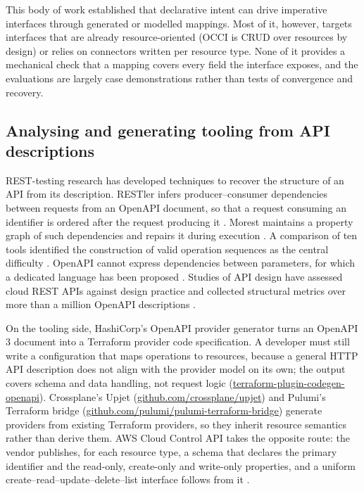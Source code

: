 This body of work established that declarative intent can drive imperative interfaces through
generated or modelled mappings. Most of it, however, targets interfaces that are already
resource-oriented (OCCI is CRUD over resources by design) or relies on connectors written per
resource type. None of it provides a mechanical check that a mapping covers every field the
interface exposes, and the evaluations are largely case demonstrations rather than tests of
convergence and recovery.

\subsection{Analysing and generating tooling from API descriptions}\label{sec:2.4}

REST-testing research has developed techniques to recover the structure of an API from its
description. RESTler infers producer--consumer dependencies between requests from an OpenAPI document,
so that a request consuming an identifier is ordered after the request producing it
\citep{atlidakis2019}. Morest maintains a property graph
of such dependencies and repairs it during execution
\citep{liu2022}. A comparison of ten tools identified
the construction of valid operation sequences as the central difficulty
\citep{kim2022}. OpenAPI cannot express dependencies
between parameters, for which a dedicated language has been proposed
\citep{martinlopez2022}. Studies of API design have
assessed cloud REST APIs against design practice
\citep{petrillo2016} and collected structural
metrics over more than a million OpenAPI descriptions
\citep{serbout2024}.

On the tooling side, HashiCorp's OpenAPI provider generator turns an OpenAPI 3 document into a
Terraform provider code specification. A developer must still write a configuration that maps
operations to resources, because a general HTTP API description does not align with the provider
model on its own; the output covers schema and data handling, not request logic
(\href{https://github.com/hashicorp/terraform-plugin-codegen-openapi}{terraform-plugin-codegen-openapi}).
Crossplane's Upjet (\href{https://github.com/crossplane/upjet}{github.com/crossplane/upjet}) and Pulumi's
Terraform bridge (\href{https://github.com/pulumi/pulumi-terraform-bridge}{github.com/pulumi/pulumi-terraform-bridge})
generate providers from existing Terraform providers, so they inherit resource semantics rather
than derive them. AWS Cloud Control API takes the opposite route: the vendor publishes, for each
resource type, a schema that declares the primary identifier and the read-only, create-only and
write-only properties, and a uniform create--read--update--delete--list interface follows from it .

